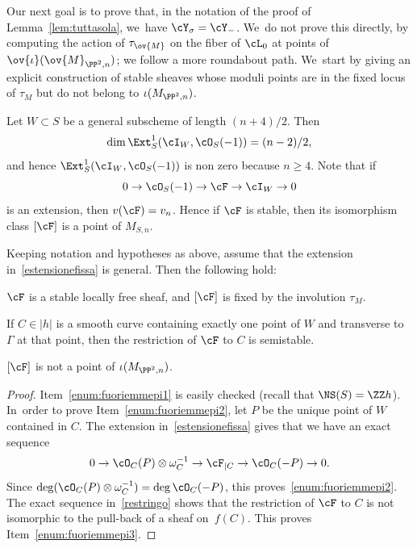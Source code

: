Our next goal is to prove that, in the notation of the proof of Lemma~\ref{lem:tuttasola}, we~have $\cY_{\sigma}=\cY_{-}$. We~do not prove this directly, \ie by computing the action of $\tau_{\ov{M}}$ on the fiber of $\cL_0$ at points of $\ov{\iota}(\ov{M}_{\PP^2,n})$; we follow a more roundabout path. We~start by giving an explicit construction of stable sheaves whose moduli points are in the fixed locus of $\tau_M$ but do not belong to $\iota(M_{\PP^2,n})$.

Let $W\subset S$ be a general subscheme of length $(n+4)/2$. Then
\begin{equation*}\label{dimext}
\dim\Ext^1_S(\cI_W,\cO_S(-1))=(n-2)/2,
\end{equation*}
and hence
$\Ext^1_S(\cI_W,\cO_S(-1))$ is non zero because $n\ge 4$. Note that if
\begin{equation}\label{estensionefissa}
0\to \cO_S(-1)\to \cF\to \cI_W\to 0
\end{equation}
is an extension, then $v(\cF)=v_n$.
Hence if $\cF$ is stable, then its isomorphism class $[\cF]$ is a point of $M_{S,n}$.

\begin{lemm}\label{lem:fuoriemmepi}
Keeping notation and hypotheses as above, assume that the extension in~\eqref{estensionefissa} is general.
Then the following hold:
\begin{enumeratea}
\item\label{enum:fuoriemmepi1} $\cF$ is a stable locally free sheaf, and $[\cF]$ is fixed by the involution $\tau_{M}$.
\item\label{enum:fuoriemmepi2} If $C\in|h|$ is a smooth curve containing exactly one point of $W$ and transverse to $\mathsf{\Gamma}$ at that point, then the restriction of $\cF$ to $C$ is semistable.
\item\label{enum:fuoriemmepi3} $[\cF]$ is not a point of $\iota(M_{\PP^2,n})$.
\end{enumeratea}
\end{lemm}

\begin{proof}
Item~\eqref{enum:fuoriemmepi1} is easily checked (recall that $\NS(S)=\ZZ h$). In~order to prove Item~\eqref{enum:fuoriemmepi2}, let $P$ be the unique point of $W$ contained in $C$.
The extension in~\eqref{estensionefissa} gives that we have an exact sequence
\begin{equation}\label{restringo}
0\to \cO_C(P)\otimes\omega^{-1}_C\to \cF_{|C}\to \cO_C(-P)\to 0.
\end{equation}
Since $\deg(\cO_C(P)\otimes\omega^{-1}_C)=\deg\cO_C(-P)$, this proves~\eqref{enum:fuoriemmepi2}.
The exact sequence in~\eqref{restringo} shows that the restriction of $\cF$ to $C$ is not isomorphic to the pull-back of a sheaf on~$f(C)$. This proves Item~\eqref{enum:fuoriemmepi3}.
\end{proof}


